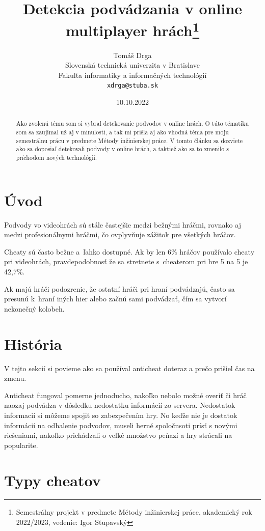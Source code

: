 \documentclass[10pt,twoside,slovak,a4paper]{article}
\title{Detekcia podvádzania v online multiplayer hrách\thanks{Semestrálny projekt v predmete Métody inžinierskej práce, akademický rok 2022/2023, vedenie: Igor Stupavský}}
\author{Tomáš Drga\\[2pt]
	{\small Slovenská technická univerzita v Bratislave}\\
	{\small Fakulta informatiky a informačných technológií}\\
	{\small \texttt{xdrga@stuba.sk}}
	}
\date{\small 10.10.2022}
\begin{document}
\maketitle

\begin{abstract}
Ako zvolenú tému som si vybral detekovanie podvodov v online hrách. O túto tématiku som sa zaujímal už aj v minulosti, a tak mi prišla aj ako vhodná téma pre moju semestrálnu prácu v predmete Métody inžinierskej práce. V tomto článku sa dozviete ako sa doposiaľ detekovali podvody v online hrách, a taktiež ako sa to zmenilo s príchodom nových technológií.
\end{abstract}


\section{Úvod}\label{uxfavod}

Podvody vo videohrách sú stále častejšie medzi bežnými hráčmi, rovnako
aj medzi profesionálnymi hráčmi, čo ovplyvňuje zážitok pre všetkých
hráčov. 

Cheaty sú často bežne a~ľahko dostupné. Ak by len 6\% hráčov
používalo cheaty pri videohrách, pravdepodobnosť že sa stretnete
s~cheaterom pri hre 5 na 5 je 42,7\%\cite{pravdepodobnost}. 

Ak majú hráči podozrenie, že ostatní hráči pri hraní podvádzajú, často sa presunú k~hraní iných hier alebo začnú sami podvádzať, čím sa vytvorí nekonečný kolobeh.


\section{História}

V tejto sekcií si povieme ako sa používal anticheat doteraz a prečo prišiel čas na zmenu. 

Anticheat fungoval pomerne jednoducho, nakoľko nebolo možné overiť či hráč naozaj podvádza v dôsledku nedostatku informácií zo servera. Nedostatok informacií si môžeme spojiť so zabezpečením hry. No keďže nie je dostatok informácií na odhalenie podvodov, museli herné spoločnsoti prísť s novými riešeniami, nakoľko prichádzali o veľké množstvo peňazí a hry strácali na popularite.

\newpage

\hypertarget{typy-cheatov}{%
\section{\texorpdfstring{Typy cheatov
}{Typy cheatov }}\label{typy-cheatov}}
\end{document}
